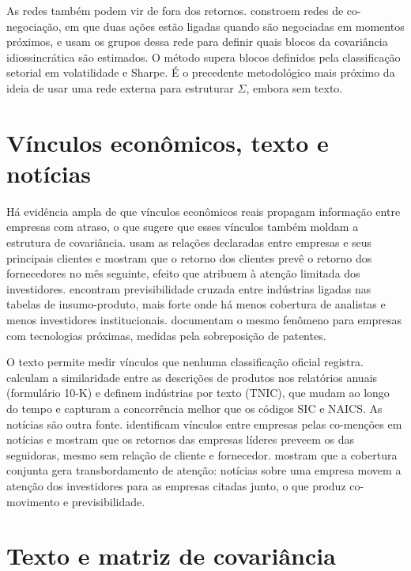 As redes também podem vir de fora dos retornos. \citet{lu2023} constroem redes de co-negociação, em que
duas ações estão ligadas quando são negociadas em momentos próximos, e usam os grupos dessa rede para
definir quais blocos da covariância idiossincrática são estimados. O método supera blocos definidos pela
classificação setorial em volatilidade e Sharpe. É o precedente metodológico mais próximo da ideia de usar
uma rede externa para estruturar $\Sigma$, embora sem texto.

\section{Vínculos econômicos, texto e notícias}
\label{sec:vinculos}

Há evidência ampla de que vínculos econômicos reais propagam informação entre empresas com atraso, o
que sugere que esses vínculos também moldam a estrutura de covariância. \citet{cohen2008} usam as
relações declaradas entre empresas e seus principais clientes e mostram que o retorno dos clientes
prevê o retorno dos fornecedores no mês seguinte, efeito que atribuem à atenção limitada dos
investidores. \citet{menzly2010} encontram previsibilidade cruzada entre indústrias ligadas nas tabelas
de insumo-produto, mais forte onde há menos cobertura de analistas e menos investidores institucionais.
\citet{lee2019} documentam o mesmo fenômeno para empresas com tecnologias próximas, medidas pela
sobreposição de patentes.

O texto permite medir vínculos que nenhuma classificação oficial registra. \citet{hoberg2016} calculam
a similaridade entre as descrições de produtos nos relatórios anuais (formulário 10-K) e definem
indústrias por texto (TNIC), que mudam ao longo do tempo e capturam a concorrência melhor que os
códigos SIC e NAICS. As notícias são outra fonte. \citet{scherbina2020} identificam vínculos entre
empresas pelas co-menções em notícias e mostram que os retornos das empresas líderes preveem os das
seguidoras, mesmo sem relação de cliente e fornecedor. \citet{guo2017} mostram que a cobertura conjunta
gera transbordamento de atenção: notícias sobre uma empresa movem a atenção dos investidores para as
empresas citadas junto, o que produz co-movimento e previsibilidade.

\section{Texto e matriz de covariância}
\label{sec:texto-sigma}

